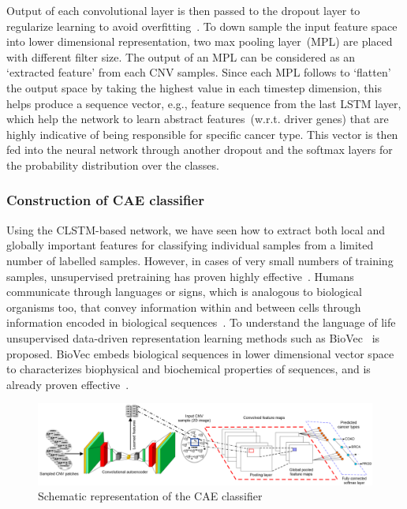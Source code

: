 \hspace*{3.5mm} Output of each convolutional layer is then passed to the dropout layer to regularize learning to avoid overfitting~\cite{vardropout}. To down sample the input feature space into lower dimensional representation, two max pooling layer~(MPL) are placed with different filter size. The output of an MPL can be considered as an `extracted feature' from each CNV samples. Since each MPL follows to `flatten' the output space by taking the highest value in each timestep dimension, this helps produce a sequence vector, e.g., feature sequence from the last LSTM layer, which help the network to learn abstract features~(w.r.t. driver genes) that are highly indicative of being responsible for specific cancer type. This vector is then fed into the neural network  through another dropout and the softmax layers for the probability distribution over the classes. 

\subsubsection{Construction of CAE classifier}
Using the CLSTM-based network, we have seen how to extract both local and globally important features for classifying individual samples from a limited number of labelled samples. However, in cases of very small numbers of training samples, unsupervised pretraining has proven highly effective~\cite{ae1,ae2,ae3}. 
Humans communicate through languages or signs, which is analogous to biological organisms too, that convey information within and between cells through information encoded in biological sequences~\cite{yue2018deep}. To understand the language of life unsupervised data-driven representation learning methods such as BioVec~\cite{asgari2015continuous} is proposed. BioVec embeds biological sequences in lower dimensional vector space to characterizes biophysical and biochemical properties of sequences, and is already proven effective~\cite{yue2018deep}. 

\begin{figure}[h]
	\centering
	\includegraphics[scale=0.6]{images/cae.png}	
    \caption{Schematic representation of the CAE classifier~\cite{karimACCA2019}}
	\label{fig:cae}
\end{figure}



